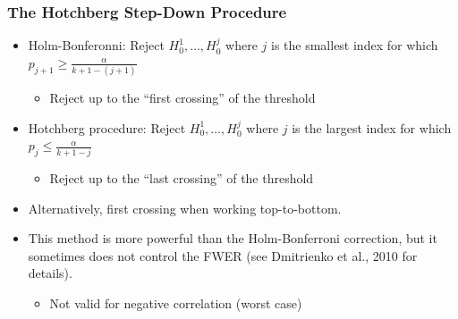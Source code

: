 \begin{frame}
\frametitle{The Hotchberg Step-Down Procedure}
\begin{itemize}
    \item Holm-Bonferonni: Reject $H_0^1,\ldots,H_0^j$ where $j$ is the smallest index for which $p_{j+1}\geq \frac{\alpha}{k+1-(j+1)}$
    \begin{itemize}
        \item Reject up to the ``first crossing'' of the threshold
    \end{itemize}
    \item Hotchberg procedure: Reject $H_0^1,\ldots,H_0^j$ where $j$ is the largest index for which $p_j\leq \frac{\alpha}{k+1-j}$
    \begin{itemize}
        \item Reject up to the ``last crossing'' of the threshold
    \end{itemize}
    \item Alternatively, first crossing when working top-to-bottom.
    \item This method is more powerful than the Holm-Bonferroni correction, but it sometimes does not control the FWER (see Dmitrienko et al., 2010 for details).
    \begin{itemize}
        \item Not valid for negative correlation (worst case)
    \end{itemize}
\end{itemize}
\end{frame}



